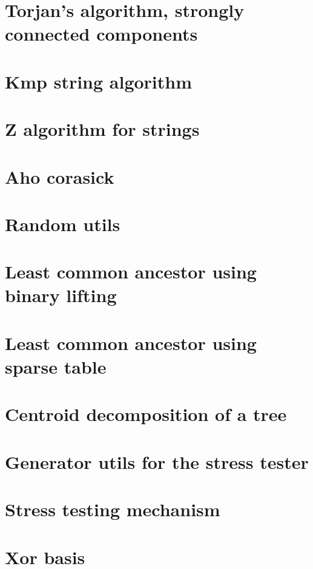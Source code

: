 \section{Torjan's algorithm, strongly connected components}
\raggedbottom

\section{Kmp string algorithm}
\raggedbottom

\section{Z algorithm for strings}
\raggedbottom

\section{Aho corasick}
\raggedbottom

\section{Random utils}
\raggedbottom

\section{Least common ancestor using binary lifting}
\raggedbottom

\section{Least common ancestor using sparse table}
\raggedbottom

\section{Centroid decomposition of a tree}
\raggedbottom

\section{Generator utils for the stress tester}
\raggedbottom

\section{Stress testing mechanism}
\raggedbottom

\section{Xor basis}
\raggedbottom